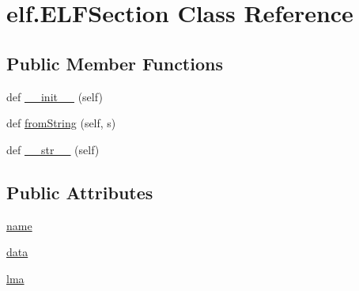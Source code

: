 \hypertarget{clasself_1_1_e_l_f_section}{}\section{elf.\+E\+L\+F\+Section Class Reference}
\label{clasself_1_1_e_l_f_section}
\subsection*{Public Member Functions}
\begin{DoxyCompactItemize}
\item 
def \hyperlink{clasself_1_1_e_l_f_section_af0a3f23276dac13632e3b2117afebe8b}{\+\_\+\+\_\+init\+\_\+\+\_\+} (self)
\item 
def \hyperlink{clasself_1_1_e_l_f_section_a0b591a4f57caf367d0978b4a6f5a34af}{from\+String} (self, s)
\item 
def \hyperlink{clasself_1_1_e_l_f_section_a3cb995c334a25d2bdf0f4143a56cb229}{\+\_\+\+\_\+str\+\_\+\+\_\+} (self)
\end{DoxyCompactItemize}
\subsection*{Public Attributes}
\begin{DoxyCompactItemize}
\item 
\hyperlink{clasself_1_1_e_l_f_section_a4125dd57752aa571c6502a36e4994501}{name}
\item 
\hyperlink{clasself_1_1_e_l_f_section_ab25be052dd52c4599a066aa06fd8257b}{data}
\item 
\hyperlink{clasself_1_1_e_l_f_section_a24d14d591da93968d4d7c5cbf7d67370}{lma}
\end{DoxyCompactItemize}
